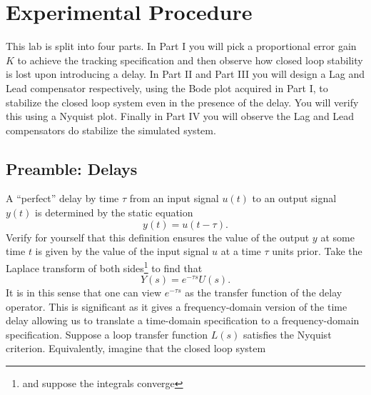 \section{Experimental Procedure}\label{Lab:4:Experiment}
This lab is split into four parts.
In Part I you will pick a proportional error gain \(K\) to achieve the tracking specification and then observe how closed loop stability is lost upon introducing a delay.
In Part II and Part III you will design a Lag and Lead compensator respectively, using the Bode plot acquired in Part I, to stabilize the closed loop system even in the presence of the delay.
You will verify this using a Nyquist plot.
Finally in Part IV you will observe the Lag and Lead compensators do stabilize the simulated system.

\subsection{Preamble: Delays}
A ``perfect'' delay by time \(\tau\) from an input signal \(u(t)\) to an output signal \(y(t)\) is determined by the static equation
\[
  y(t) = u(t - \tau).
\]
Verify for yourself that this definition ensures the value of the output \(y\) at some time \(t\) is given by the value of the input signal \(u\) at a time \(\tau\) units prior.
Take the Laplace transform of both sides\footnote{and suppose the integrals converge} to find that
\[
  Y(s) = e^{-\tau s} U(s).
\]
It is in this sense that one can view \(e^{-\tau s}\) as the transfer function of the delay operator.
This is significant as it gives a frequency-domain version of the time delay allowing us to translate a time-domain specification to a frequency-domain specification.
%
Suppose a loop transfer function \(L(s)\) satisfies the Nyquist criterion.
Equivalently, imagine that the closed loop system
%
\begin{center}
\end{center}
